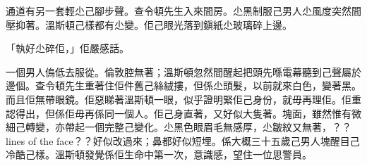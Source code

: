 通道有另一套輕尐己腳步聲。查令頓先生入來間房。尐黑制服己男人尐風度突然間壓抑著。溫斯頓己樣都有尐變。佢己眼光落到鎭紙尐玻璃碎上邊。

「執好尐碎佢，」佢嚴感話。

一個男人𠌥低去服從。倫敦腔無著；溫斯頓忽然間醒起把頭先喺電幕聽到己聲屬於邊個。查令頓先生重著住佢件舊己絲絨摟，但係尐頭髮，以前就來白色，變著黑。而且佢無帶眼鏡。佢惡睇著溫斯頓一眼，似乎證明緊佢己身份，就毋再理佢。佢重認得出，但係佢毋再係同一個人。佢己身直著，又好似大隻著。塊面，雖然惟有微細己轉變，亦帶起一個完整己變化。尐黑色眼眉毛無感厚，尐皺紋又無著，？？lines of the face？？好似改過來；鼻都好似短埋。係大概三十五歲己男人塊醒目己冷酷己樣。溫斯頓發覺係佢生命中第一次，意識感，望住一位思警員。
